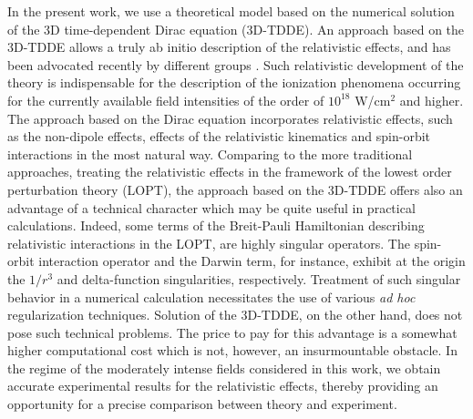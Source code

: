 \documentclass[aps,prl,twocolumn,superscriptaddress,amsmath,amssymb]{revtex4-1}
\begin{document}
In the present work, we use a theoretical model based on the numerical solution of the 3D time-dependent Dirac equation (3D-TDDE). An approach based on the 3D-TDDE allows a truly ab initio description of the relativistic effects, and has been advocated recently by different groups \cite{Ivanov2015, Kjellsson2017}. Such relativistic development of the theory is indispensable for the description of the ionization phenomena occurring for the currently available field intensities of the order of $10^{18}$ W/cm$^2$ and higher. The approach based on the Dirac equation incorporates relativistic effects, such as the non-dipole effects, effects of the relativistic kinematics and spin-orbit interactions in the most natural way. Comparing to the more traditional approaches, treating the relativistic effects in the framework of the lowest order perturbation theory (LOPT), 
the approach based on the 3D-TDDE offers also an advantage of a technical character which may be quite useful in practical calculations. Indeed, some terms of the Breit-Pauli Hamiltonian \cite{Sobelman72} describing relativistic interactions in the LOPT, are highly singular operators. The spin-orbit interaction operator and the Darwin term, for instance, exhibit at the origin the $1/r^3$ and delta-function singularities, respectively.
Treatment of such singular behavior in a numerical calculation
necessitates the use of various {\it ad hoc} regularization techniques. Solution of the 3D-TDDE, on the other hand, does not pose such technical problems. The price to pay for this advantage is a somewhat higher computational cost which is not, however, an insurmountable obstacle. In the regime of the moderately intense fields considered in this work, we obtain accurate experimental results for the relativistic effects, thereby providing an opportunity for a precise comparison between theory and experiment. 
\end{document}
